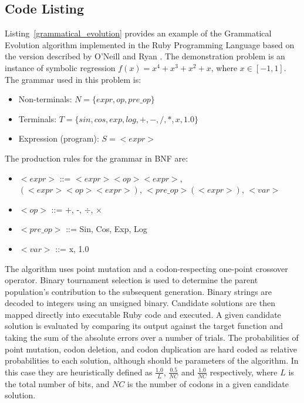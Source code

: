 \subsection{Code Listing}
Listing~\ref{grammatical_evolution} provides an example of the Grammatical Evolution algorithm implemented in the Ruby Programming Language based on the version described by O'Neill and Ryan \cite{O'Neill2001}.
The demonstration problem is an instance of symbolic regression $f(x)=x^4+x^3+x^2+x$, where $x\in[-1,1]$. 
The grammar used in this problem is: 
\begin{itemize}
	\item Non-terminals: $N=\{expr,op,pre\_op\}$
	\item Terminals: $T=\{sin,cos,exp,log,+,-,/,*,x,1.0\}$
	\item Expression (program): $S=<expr>$
\end{itemize}

The production rules for the grammar in BNF are:
\begin{itemize}
	\item $<expr>$ ::= $<expr><op><expr>$, $(<expr><op><expr>)$, $<pre\_op>(<expr>)$, $<var>$
	\item $<op>$ ::= +, -, $\div$, $\times$
	\item $<pre\_op>$ ::= Sin, Cos, Exp, Log
	\item $<var>$ ::= x, 1.0
\end{itemize}

The algorithm uses point mutation and a codon-respecting one-point crossover operator. Binary tournament selection is used to determine the parent population's contribution to the subsequent generation. 
Binary strings are decoded to integers using an unsigned binary. Candidate solutions are then mapped directly into executable Ruby code and executed. A given candidate solution is evaluated by comparing its output against the target function and taking the sum of the absolute errors over a number of trials. The probabilities of point mutation, codon deletion, and codon duplication are hard coded as relative probabilities to each solution, although should be parameters of the algorithm. In this case they are heuristically defined as $\frac{1.0}{L}$, $\frac{0.5}{NC}$ and $\frac{1.0}{NC}$ respectively, where $L$ is the total number of bits, and $NC$ is the number of codons in a given candidate solution.

